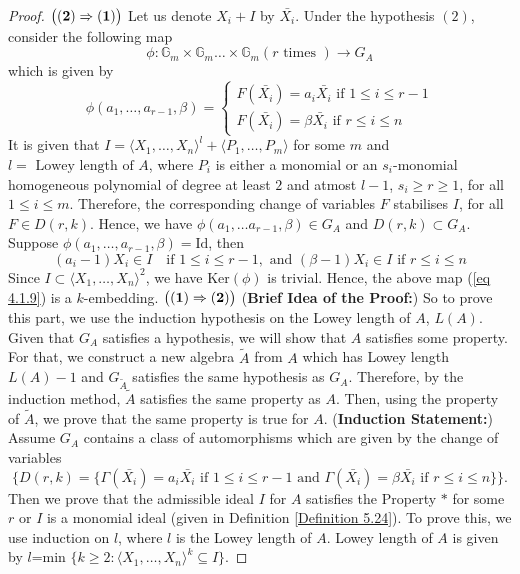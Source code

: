 \documentclass[12pt]{amsart}
\theoremstyle{definition}
\numberwithin{equation}{section}
\begin{document}
\begin{proof}
$\bigl(\bold{(2)}\Rightarrow \bold{(1)}\big)$
Let us denote $X_i+I$ by $\bar{X_i}$. Under the hypothesis $(2)$, consider the following map \[\phi:\mathbb{G}_m\times \mathbb{G}_m\dots \times \mathbb{G}_m(r \text{ times }) \rightarrow G_A\] which is given by
\begin{equation}\label{eq 4.1.9}
    \phi(a_1,\dots,a_{r-1},\beta)=
    \begin{cases}
         F(\bar{X_i})=a_i\bar{X_i} \text{ if } 1\leq i \leq r-1 \\
     F(\bar{X_i})=\beta \bar{X_i} \text{ if } r\leq i\leq n
    \end{cases}
\end{equation}    
It is given that $I=\langle X_1,\dots,X_n\rangle^l+\langle P_1,\dots,P_m\rangle$ for some $m$ and $l=\text{ Lowey length of }A$, where $P_i$ is either a monomial or an $s_i$-monomial homogeneous polynomial of degree at least $2$ and atmost $l-1$, $s_i\geq r\geq1$, for all $1\leq i\leq m$. Therefore, the corresponding change of variables $F$ stabilises $I$, for all $F\in D(r,k)$. Hence, we have $\phi(a_1,\dots a_{r-1},\beta)\in G_A$ and $D(r,k)\subset G_A$. Suppose $\phi(a_1,\dots,a_{r-1},\beta)=\text{Id}$, then \[(a_i-1)X_i\in I \quad \text{if } 1\leq i\leq r-1, \text{ and } (\beta-1)X_i\in I \text{ if } r\leq i \leq n\] Since $I\subset \langle X_1,\dots,X_n\rangle^2$, we have $\text{Ker}(\phi)$ is trivial. Hence, the above map (\ref{eq 4.1.9}) is a $k$-embedding.
\vskip6mm
\noindent
$\big(\bold{(1)}\Rightarrow \bold{(2)}\big)$ 
\noindent
(\textbf{Brief Idea of the Proof:}) So to prove this part, we use the induction hypothesis on the Lowey length of $A$, $L(A)$. Given that $G_A$ satisfies a hypothesis, we will show that $A$ satisfies some property. For that, we construct a new algebra $\tilde{A}$ from $A$ which has Lowey length $L(A)-1$ and $G_{\tilde{A}}$ satisfies the same hypothesis as $G_A$. Therefore, by the induction method, $\tilde{A}$ satisfies the same property as $A$. Then, using the property of $\tilde{A}$, we prove that the same property is true for $A$.
\vskip2mm
\noindent
(\textbf{Induction Statement:}) Assume $G_A$ contains a class of automorphisms which are given by the change of variables \[\biggl\{D(r,k)=\{\Gamma(\bar{X_i})=a_{i}\bar{X_{i}} \text{ if } 1\leq i\leq r-1 \text{ and } \Gamma(\bar{X_i})=\beta\bar{X_i} \text{ if } r\leq i\leq n\}\biggl\}.\] Then we prove that the admissible ideal $I$ for $A$ satisfies the Property $*$ for some $r$ or $I$ is a monomial ideal (given in Definition \ref{Definition 5.24}). To prove this, we use induction on $l$, where $l$ is the Lowey length of $A$. Lowey length of $A$ is given by $l$=min $\{k\geq 2:\langle X_1,\dots,X_n \rangle^k \subseteq I \}$.\par

\end{proof}
\end{document}
